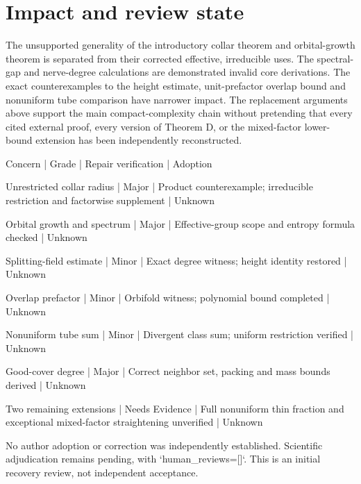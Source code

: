 \documentclass[10pt]{article}
\begin{document}
\section*{Impact and review state}
The unsupported generality of the introductory collar theorem and orbital-growth theorem is separated from their corrected effective, irreducible uses. The spectral-gap and nerve-degree calculations are demonstrated invalid core derivations. The exact counterexamples to the height estimate, unit-prefactor overlap bound and nonuniform tube comparison have narrower impact. The replacement arguments above support the main compact-complexity chain without pretending that every cited external proof, every version of Theorem D, or the mixed-factor lower-bound extension has been independently reconstructed.\par
Concern | Grade | Repair verification | Adoption\par
Unrestricted collar radius | Major | Product counterexample; irreducible restriction and factorwise supplement | Unknown\par
Orbital growth and spectrum | Major | Effective-group scope and entropy formula checked | Unknown\par
Splitting-field estimate | Minor | Exact degree witness; height identity restored | Unknown\par
Overlap prefactor | Minor | Orbifold witness; polynomial bound completed | Unknown\par
Nonuniform tube sum | Minor | Divergent class sum; uniform restriction verified | Unknown\par
Good-cover degree | Major | Correct neighbor set, packing and mass bounds derived | Unknown\par
Two remaining extensions | Needs Evidence | Full nonuniform thin fraction and exceptional mixed-factor straightening unverified | Unknown\par
No author adoption or correction was independently established. Scientific adjudication remains pending, with `human\_reviews=[]`. This is an initial recovery review, not independent acceptance.\par
\end{document}

